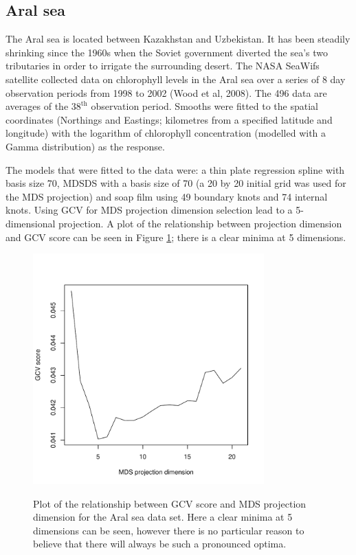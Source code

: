 \documentclass[useAMS, referee]{biom}
\begin{document}
\subsection{Aral sea}

The Aral sea is located between Kazakhstan and Uzbekistan. It has been steadily shrinking since the 1960s when the Soviet government diverted the sea's two tributaries in order to irrigate the surrounding desert. The NASA SeaWifs satellite collected data on chlorophyll levels in the Aral sea over a series of 8 day observation periods from 1998 to 2002 (Wood et al, 2008). The 496 data are averages of the $38^\text{th}$ observation period. Smooths were fitted to the spatial coordinates (Northings and Eastings; kilometres from a specified latitude and longitude) with the logarithm of chlorophyll concentration (modelled with a Gamma distribution) as the response.

The models that were fitted to the data were: a thin plate regression spline with basis size 70, MDSDS with a basis size of 70 (a 20 by 20 initial grid was used for the MDS projection) and soap film using 49 boundary knots and 74 internal knots. Using GCV for MDS projection dimension selection lead to a 5-dimensional projection. A plot of the relationship between projection dimension and GCV score can be seen in Figure \ref{aral-gcvplot}; there is a clear minima at 5 dimensions.

\begin{figure}
\centering
\includegraphics[width=3.5in]{examples/aral/aral-gcvplot.pdf} \\
\caption{Plot of the relationship between GCV score and MDS projection dimension for the Aral sea data set. Here a clear minima at 5 dimensions can be seen, however there is no particular reason to believe that there will always be such a pronounced optima.}
\label{aral-gcvplot}
\end{figure}
\end{document}
